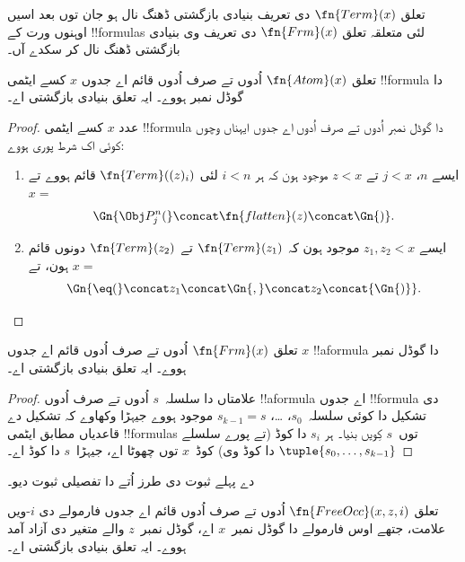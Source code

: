\documentclass[../../../include/open-logic-section]{subfiles}
\begin{document}

تعلق $\fn{Term}(x)$ دی تعریف بنیادی بازگشتی ڈھنگ نال ہو جان
توں بعد اسیں اوہنوں ورت کے !!{formula}s لئی متعلقہ تعلق
$\fn{Frm}(x)$ دی تعریف وی بنیادی بازگشتی ڈھنگ نال کر سکدے آں۔

\begin{prop}
تعلق $\fn{Atom}(x)$ اُدوں تے صرف اُدوں قائم اے جدوں $x$ کسے
ایٹمی !!{formula} دا گوڈل نمبر ہووے۔ ایہ تعلق بنیادی بازگشتی اے۔
\end{prop}

\begin{proof}
عدد $x$ کسے ایٹمی !!{formula} دا گوڈل نمبر اُدوں تے صرف اُدوں
اے جدوں ایہناں وچوں کوئی اک شرط پوری ہووے:
\begin{enumerate}
\item ایسے $n$، $j < x$ تے $z < x$ موجود ہون کہ ہر $i < n$
  لئی $\fn{Term}((z)_i)$ قائم ہووے تے $x = $
\[
\Gn{\Obj P^n_j(} \concat \fn{flatten}(z) \concat \Gn{)}.
\]
\item ایسے $z_1, z_2 < x$ موجود ہون کہ $\fn{Term}(z_1)$
  تے $\fn{Term}(z_2)$ دونوں قائم ہون، تے $x = $
\[
\Gn{{\eq}(} \concat z_1 \concat \Gn{,} \concat z_2 \concat{\Gn{)}}.
\]
\end{enumerate}
\end{proof}

\begin{prop}
تعلق $\fn{Frm}(x)$ اُدوں تے صرف اُدوں قائم اے جدوں $x$
!!a{formula} دا گوڈل نمبر ہووے۔ ایہ تعلق بنیادی بازگشتی اے۔
\end{prop}

\begin{proof}
علامتاں دا سلسلہ~$s$ اُدوں تے صرف اُدوں !!a{formula} اے جدوں
!!{formula} دی تشکیل دا کوئی سلسلہ~$s_0$، \dots، $s_{k-1} = s$
موجود ہووے جیہڑا وکھاوے کہ تشکیل دے قاعدیاں مطابق ایٹمی
!!{formula}s توں~$s$ کِویں بنیا۔ ہر $s_i$ دا کوڈ (تے پورے
سلسلے $\tuple{s_0, \dots, s_{k-1}}$ دا کوڈ وی) کوڈ~$x$ توں
چھوٹا اے، جیہڑا~$s$ دا کوڈ اے۔
\end{proof}

\begin{prob}
 دے پہلے ثبوت دی طرز اُتے
 دا تفصیلی ثبوت دیو۔
\end{prob}

\begin{prop}
تعلق $\fn{FreeOcc}(x, z, i)$ اُدوں تے صرف اُدوں قائم اے جدوں
فارمولے دی $i$-ویں علامت، جتھے اوس فارمولے دا گوڈل نمبر~$x$
اے، گوڈل نمبر~$z$ والے متغیر دی آزاد آمد ہووے۔
ایہ تعلق بنیادی بازگشتی اے۔
\end{prop}
\end{document}
